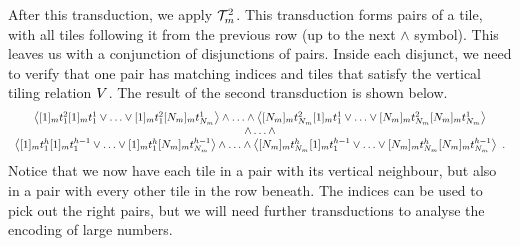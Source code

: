 After this transduction, we apply $\mathcal{T}^2_m$. This
transduction forms pairs of a tile, with all tiles following it from the
previous row (up to the next $\land$ symbol). This leaves us with a
conjunction of disjunctions of pairs. Inside each disjunct, we need to
verify that one pair has matching indices and tiles that satisfy the
vertical tiling relation $V$. The result of the second transduction
is shown below.
\[
    \begin{array}{c}
        \left\langle
            [1]_{m} t^2_1
            [1]_{m} t^1_1
            \lor
            \ldots
            \lor
            [1]_{m} t^2_1
            [N_{m}]_{m} t^1_{N_{m}}
        \right\rangle
            \land
            \ldots
            \land
            \left\langle
                [N_{m}]_{m} t^2_{N_{m}}
                [1]_{m} t^1_1
                \lor
                \ldots
                \lor
                [N_{m}]_{m} t^2_{N_{m}}
                [N_{m}]_{m} t^1_{N_{m}}
            \right\rangle \\
        \land \ldots \land \\
        \left\langle
            [1]_{m} t^h_1
            [1]_{m} t^{h-1}_1
            \lor
            \ldots
            \lor
            [1]_{m} t^h_1
            [N_{m}]_{m}
                t^{h-1}_{N_{m}}
        \right\rangle
            \land
            \ldots
            \land
            \left\langle
                [N_{m}]_{m}
                    t^h_{N_{m}}
                [1]_{m} t^{h-1}_1
                \lor
                \ldots
                \lor
                [N_{m}]_{m}
                    t^h_{N_{m}}
                [N_{m}]_{m}
                    t^{h-1}_{N_{m}}
            \right\rangle \ .\\
    \end{array}
\]
Notice that we now have each tile in a pair with its vertical neighbour,
but also in a pair with every other tile in the row beneath. The indices
can be used to pick out the right pairs, but we will need further
transductions to analyse the encoding of large numbers.

